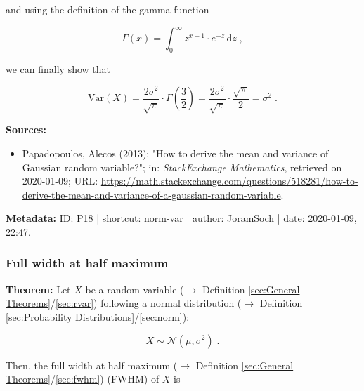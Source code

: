\documentclass[a4paper,12pt,twoside]{book}
\begin{document}
and using the definition of the gamma function

\begin{equation} \label{eq:norm-var-gam-fct}
\Gamma(x) = \int_{0}^{\infty} z^{x-1} \cdot e^{-z} \, \mathrm{d}z \; ,
\end{equation}

we can finally show that

\begin{equation} \label{eq:norm-var-norm-var-s6}
\mathrm{Var}(X) = \frac{2 \sigma^2}{\sqrt{\pi}} \cdot \Gamma\!\left(\frac{3}{2}\right) = \frac{2 \sigma^2}{\sqrt{\pi}} \cdot \frac{\sqrt{\pi}}{2} = \sigma^2 \; .
\end{equation}



\vspace{1em}
\textbf{Sources:}
\begin{itemize}
\item Papadopoulos, Alecos (2013): "How to derive the mean and variance of Gaussian random variable?"; in: \textit{StackExchange Mathematics}, retrieved on 2020-01-09; URL: \url{https://math.stackexchange.com/questions/518281/how-to-derive-the-mean-and-variance-of-a-gaussian-random-variable}.
\end{itemize}


\vspace{1em}
\textbf{Metadata:} ID: P18 | shortcut: norm-var | author: JoramSoch | date: 2020-01-09, 22:47.
\vspace{1em}



\subsubsection[\textbf{Full width at half maximum}]{Full width at half maximum} \label{sec:norm-fwhm}
\setcounter{equation}{0}

\textbf{Theorem:} Let $X$ be a random variable ($\rightarrow$ Definition \ref{sec:General Theorems}/\ref{sec:rvar}) following a normal distribution ($\rightarrow$ Definition \ref{sec:Probability Distributions}/\ref{sec:norm}):

\begin{equation} \label{eq:norm-fwhm-norm}
X \sim \mathcal{N}(\mu, \sigma^2) \; .
\end{equation}

Then, the full width at half maximum ($\rightarrow$ Definition \ref{sec:General Theorems}/\ref{sec:fwhm}) (FWHM) of $X$ is
\end{document}
